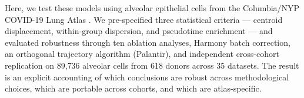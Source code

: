 \documentclass[11pt]{article}
\begin{document}
Here, we test these models using alveolar epithelial cells from the Columbia/NYP COVID-19 Lung Atlas \citep{Melms2021}. We pre-specified three statistical criteria --- centroid displacement, within-group dispersion, and pseudotime enrichment --- and evaluated robustness through ten ablation analyses, Harmony batch correction, an orthogonal trajectory algorithm (Palantir), and independent cross-cohort replication on 89{,}736 alveolar cells from 618 donors across 35 datasets. The result is an explicit accounting of which conclusions are robust across methodological choices, which are portable across cohorts, and which are atlas-specific.

\end{document}
